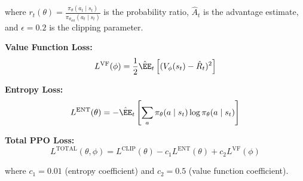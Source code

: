 \documentclass[12pt,oneside]{article}
\begin{document}
where $r_t(\theta) = \frac{\pi_\theta(a_t \mid s_t)}{\pi_{\theta_{\text{old}}}(a_t \mid s_t)}$ is the probability ratio, $\hat{A}_t$ is the advantage estimate, and $\epsilon = 0.2$ is the clipping parameter.

\textbf{Value Function Loss:}
\begin{equation}
L^{\text{VF}}(\phi) = \frac{1}{2}\hat{\EE}_t\left[(V_\phi(s_t) - \hat{R}_t)^2\right]
\end{equation}

\textbf{Entropy Loss:}
\begin{equation}
L^{\text{ENT}}(\theta) = -\hat{\EE}_t\left[\sum_a \pi_\theta(a \mid s_t) \log \pi_\theta(a \mid s_t)\right]
\end{equation}

\textbf{Total PPO Loss:}
\begin{equation}
L^{\text{TOTAL}}(\theta, \phi) = L^{\text{CLIP}}(\theta) - c_1 L^{\text{ENT}}(\theta) + c_2 L^{\text{VF}}(\phi)
\end{equation}

where $c_1 = 0.01$ (entropy coefficient) and $c_2 = 0.5$ (value function coefficient).
\end{document}
